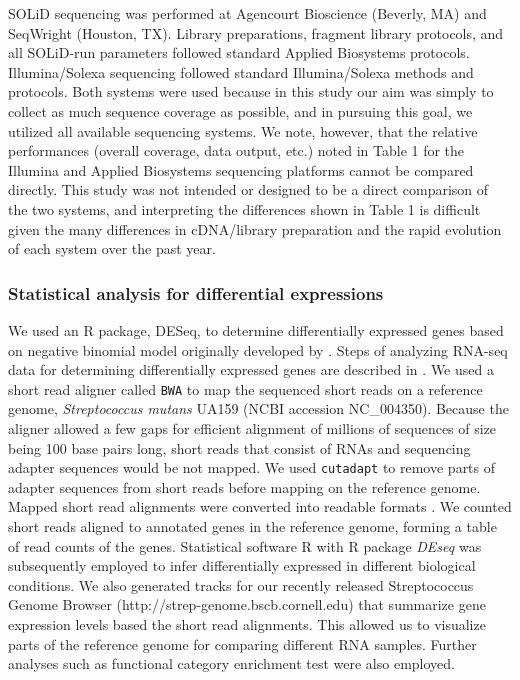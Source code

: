 \documentclass{article}
\newcommand{\Rpackage}[1]{R package \textit{#1}}
\newcommand{\program}[1]{{\texttt{#1}}}
\begin{document}
SOLiD sequencing was performed at Agencourt Bioscience (Beverly, MA) and
SeqWright (Houston, TX). Library preparations, fragment library protocols, and
all SOLiD-run parameters followed standard Applied Biosystems protocols.
Illumina/Solexa sequencing followed standard Illumina/Solexa methods and
protocols. Both systems were used because in this study our aim was simply to
collect as much sequence coverage as possible, and in pursuing this goal, we
utilized all available sequencing systems. We note, however, that the relative
performances (overall coverage, data output, etc.) noted in Table 1 for the
Illumina and Applied Biosystems sequencing platforms cannot be compared
directly. This study was not intended or designed to be a direct comparison of
the two systems, and interpreting the differences shown in Table 1 is difficult
given the many differences in cDNA/library preparation and the rapid evolution
of each system over the past year.


\subsubsection{Statistical analysis for differential expressions}
We used an R package, DESeq, \cite{Anders2010} to determine differentially
expressed genes based on negative binomial model originally developed by \cite{Robinson2007}.
Steps of analyzing RNA-seq data for determining differentially expressed genes
are described in \cite{Oshlack2010}. We used a short read aligner called
\program{BWA} \cite{Li2009a} to map the sequenced short reads on a reference genome,
\textit{Streptococcus mutans} UA159 (NCBI accession NC\_004350). Because the
aligner allowed a few gaps for efficient alignment of millions of sequences of
size being 100 base pairs long, short reads that consist of RNAs and sequencing
adapter sequences would be not mapped. We used \program{cutadapt} \cite{Martin2011} to
remove parts of adapter sequences from short reads before mapping on the
reference genome. Mapped short read alignments were converted into readable
formats \cite{Li2009b}. We counted short reads aligned to annotated genes in the
reference genome, forming a table of read counts of the genes. Statistical
software R \cite{R2011} with \Rpackage{DEseq} \cite{Anders2010}
was subsequently employed to infer differentially expressed in different
biological conditions.  We also generated tracks for our recently released
Streptococcus Genome Browser (http://strep-genome.bscb.cornell.edu) that
summarize gene expression levels based the short read alignments. This allowed
us to visualize parts of the reference genome for comparing different RNA
samples. Further analyses such as functional category enrichment test
\cite{Young2010} were also employed.
\end{document}
